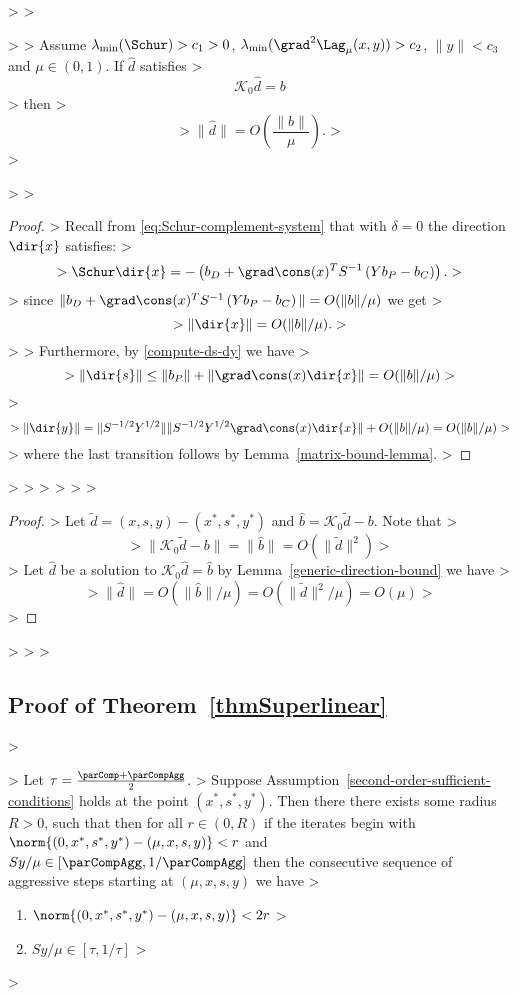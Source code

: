 > 
> \begin{lemma}\label{generic-direction-bound}
> 
> Assume $\lambda_{\min}(\Schur) > c_{1} > 0$, $\lambda_{\min}( \grad^2 \Lag_{\mu}(x,y) ) > c_{2}$, $\| y \| < c_{3}$ and $\mu \in (0,1)$. If $\hat{d}$ satisfies
> $$\mathcal{K}_{0} \hat{d} = b$$
> then
> $$
> \| \hat{d} \| = O \left( \frac{\| b \|}{\mu} \right).
> $$
> \end{lemma}
> 
> \begin{proof}
> Recall from \eqref{eq:Schur-complement-system} that with $\delta = 0$ the direction $\dir{x}$ satisfies:
> $$
> \Schur \dir{x} = -\left( b_{D} + \grad \cons(x)^T S^{-1} \left( Y b_{P} - b_{C} \right) \right).
> $$
> since $\| b_{D} + \grad \cons(x)^T S^{-1} \left( Y b_{P} - b_{C} \right) \| = O( \| b \| / \mu)$ we get
> $$
> \| \dir{x} \| = O( \| b \| / \mu).
> $$
> 
> Furthermore, by \eqref{compute-ds-dy} we have
> $$
> \| \dir{s} \| \le \| b_{P} \| + \| \grad \cons(x) \dir{x} \| = O( \| b \| / \mu )
> $$
> $$
> \| \dir{y} \| = \| S^{-1/2} Y^{1/2} \| \| S^{-1/2} Y^{1/2} \grad \cons(x) \dir{x} \| + O(  \| b \| / \mu) = O(  \| b \| / \mu)
> $$
> where the last transition follows by Lemma~\ref{matrix-bound-lemma}.
> \end{proof}
> 
> 
> 
> \lemDistanceToDirection*
> 
> \begin{proof}
> Let $\tilde{d} = (x,s,y) - (x^{*}, s^{*}, y^{*})$ and $\hat{b} = \mathcal{K}_{0} \tilde{d} - b$. Note that
> $$
> \| \mathcal{K}_{0} \tilde{d} - b \| = \| \hat{b} \| = O( \| \tilde{d} \|^2 )
> $$
> Let $\hat{d}$ be a solution to $\mathcal{K}_{0} \hat{d} = \hat{b}$ by Lemma~\ref{generic-direction-bound} we have
> $$
> \| \hat{d} \| = O ( \| \hat{b} \| / \mu ) = O( \| \tilde{d} \|^2 / \mu ) = O(\mu)
> $$
> \end{proof}
> 
> 
> \subsection{Proof of Theorem~\ref{thmSuperlinear}}\label{sec:thmSuperlinear}
> \begin{lemma}
> Let $\tau = \frac{\parComp + \parCompAgg}{2}$.
> Suppose Assumption~\ref{second-order-sufficient-conditions} holds at the point $(x^{*}, s^{*}, y^{*})$. Then there there exists some radius $R > 0$, such that then for all $r \in (0,R)$  if the iterates begin with $\norm{ (0,x^{*},s^{*},y^{*}) - (\mu,x,s,y) } < r$ and $Sy / \mu \in [\parCompAgg, 1/\parCompAgg]$ then the consecutive sequence of aggressive steps starting at $(\mu,x,s,y)$ we have
> \begin{enumerate}
> \item $\norm{ (0,x^{*},s^{*},y^{*}) - (\mu, x,s,y) } < 2 r$
> \item $Sy / \mu \in [\tau, 1/\tau]$
> \end{enumerate}
> \end{lemma}
